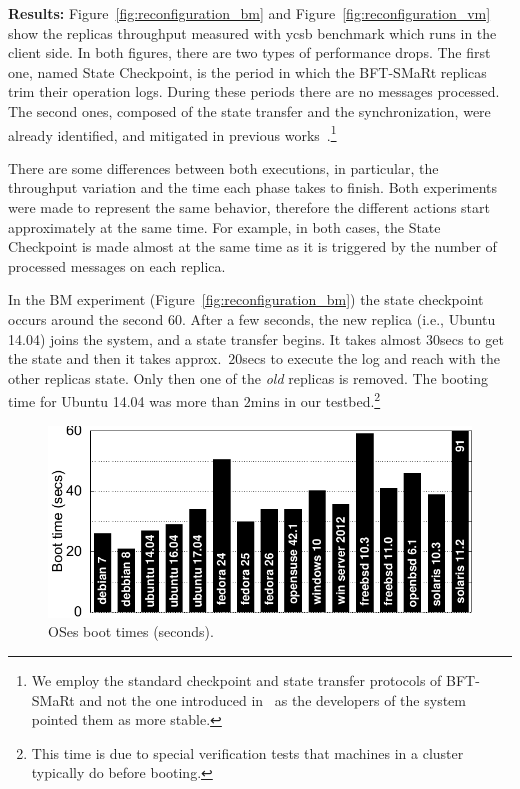 \textbf{Results:}
Figure~\ref{fig:reconfiguration_bm} and Figure~\ref{fig:reconfiguration_vm} show the replicas throughput measured with \gls{ycsb} benchmark which runs in the client side. 
In both figures, there are two types of performance drops. 
The first one, named State Checkpoint, is the period in which the BFT-SMaRt replicas trim their operation logs.
During these periods there are no messages processed. 
The second ones, composed of the state transfer and the synchronization, were already identified, and mitigated in previous works~\cite{Bessani:2013}.\footnote{We employ the standard checkpoint and state transfer protocols of BFT-SMaRt and not the one introduced in~\cite{Bessani:2013} as the developers of the system pointed them as more stable.}  

There are some differences between both executions, in particular, the throughput variation and the time each phase takes to finish.
Both experiments were made to represent the same behavior, therefore the different actions start approximately at the same time.
For example, in both cases, the State Checkpoint is made almost at the same time as it is triggered by the number of processed messages on each replica.

In the BM experiment (Figure~\ref{fig:reconfiguration_bm}) the state checkpoint occurs around the second $60$.
After a few seconds, the new replica (i.e., Ubuntu 14.04) joins the system, and a state transfer begins.
It takes almost $30$secs to get the state and then it takes approx.~$20$secs to execute the log and reach with the other replicas state. 
Only then one of the \emph{old} replicas is removed. 
The booting time for Ubuntu 14.04 was more than $2$mins in our testbed.\footnote{This time is due to special verification tests that machines in a cluster typically do before booting.} 

\begin{figure}[h]
\begin{center}
\includegraphics[width=0.8\columnwidth]{images/gnuplot/vagrant/updown/boot.pdf}
\caption{OSes boot times (seconds).}
\label{fig:boot}
\end{center}
\end{figure}


